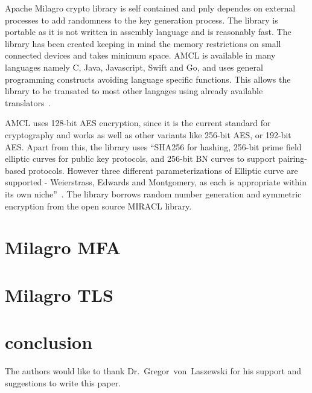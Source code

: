 Apache Milagro crypto library is
self contained and pnly dependes on external processes to add
randomness to the key generation process. The library is portable as
it is not written in assembly language and is reasonably fast. The
library has been created keeping in mind the memory restrictions on
small connected devices and takes minimum space. AMCL is available in
many languages namely C, Java, Javascript, Swift and Go, and uses
general programming constructs avoiding language specific
functions. This allows the library to be transated to most other
langages using already available translators~\cite{mcl-white-paper}.

AMCL uses 128-bit AES encryption, since it is the current standard for
cryptography and works as well as other variants like 256-bit AES, or
192-bit AES. Apart from this, the library uses ``SHA256 for hashing,
256-bit prime field elliptic curves for public key protocols, and
256-bit BN curves to support pairing-based protocols. However three
different parameterizations of Elliptic curve are supported -
Weierstrass, Edwards and Montgomery, as each is appropriate within its
own niche''~\cite{mcl-white-paper}. The library borrows random number
generation and symmetric encryption from the open source MIRACL
library\cite{mcl-white-paper}.


\section{Milagro MFA}

\section{Milagro TLS}

\section{conclusion}


\begin{acks}

  The authors would like to thank Dr.~Gregor~von~Laszewski for his
  support and suggestions to write this paper.

\end{acks}




 
